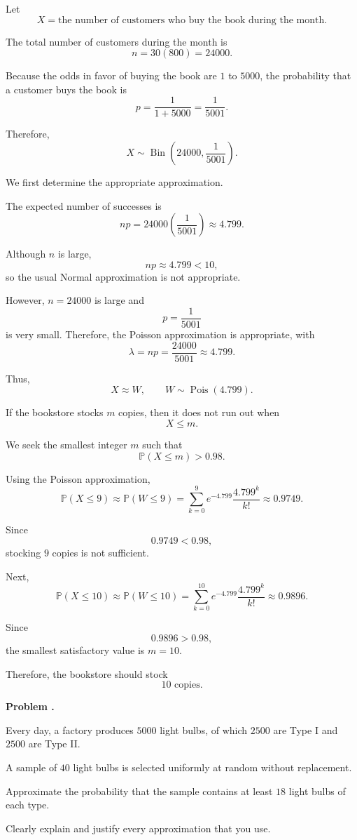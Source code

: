 \documentclass[11pt]{article}
\newcounter{problem}
\newenvironment{problem}[1][]{
    \refstepcounter{problem}
    \begin{problemheader}
        \textbf{Problem \theproblem%
        \if\relax\detokenize{#1}\relax
        \else. #1%
        \fi}
    \end{problemheader}
}{
    \vspace{0.5em}
}
\newenvironment{solution}{
    \par
    \begin{tcolorbox}[
        colback=white,
        colframe=uwgold,
        boxrule=0.7pt,
        arc=2mm,
        left=3mm,
        right=3mm,
        top=2mm,
        bottom=2mm,
        breakable,
        before skip=0.5em,
        after skip=1em,
        title=\textbf{Solution},
        coltitle=uwpurple,
        fonttitle=\bfseries
    ]
}{
    \end{tcolorbox}
}
\begin{document}
\begin{solution}

Let
\[
X=\text{the number of customers who buy the book during the month}.
\]

The total number of customers during the month is
\[
n=30(800)=24000.
\]

Because the odds in favor of buying the book are \(1\) to \(5000\), the
probability that a customer buys the book is
\[
p=\frac{1}{1+5000}=\frac{1}{5001}.
\]

Therefore,
\[
X\sim\operatorname{Bin}\left(24000,\frac{1}{5001}\right).
\]

We first determine the appropriate approximation.

The expected number of successes is
\[
np
=
24000\left(\frac{1}{5001}\right)
\approx4.799.
\]

Although \(n\) is large,
\[
np\approx4.799<10,
\]
so the usual Normal approximation is not appropriate.

However, \(n=24000\) is large and
\[
p=\frac{1}{5001}
\]
is very small. Therefore, the Poisson approximation is appropriate, with
\[
\lambda=np=\frac{24000}{5001}\approx4.799.
\]

Thus,
\[
X\approx W,
\qquad
W\sim\operatorname{Pois}(4.799).
\]

If the bookstore stocks \(m\) copies, then it does not run out when
\[
X\leq m.
\]

We seek the smallest integer \(m\) such that
\[
\mathbb{P}(X\leq m)>0.98.
\]

Using the Poisson approximation,
\[
\mathbb{P}(X\leq9)
\approx
\mathbb{P}(W\leq9)
=
\sum_{k=0}^{9}
e^{-4.799}\frac{4.799^k}{k!}
\approx0.9749.
\]

Since
\[
0.9749<0.98,
\]
stocking \(9\) copies is not sufficient.

Next,
\[
\mathbb{P}(X\leq10)
\approx
\mathbb{P}(W\leq10)
=
\sum_{k=0}^{10}
e^{-4.799}\frac{4.799^k}{k!}
\approx0.9896.
\]

Since
\[
0.9896>0.98,
\]
the smallest satisfactory value is \(m=10\).

Therefore, the bookstore should stock
\[
 {10\text{ copies}.}
\]

\end{solution}





\newpage
\begin{problem}

Every day, a factory produces \(5000\) light bulbs, of which \(2500\) are
Type I and \(2500\) are Type II.

A sample of \(40\) light bulbs is selected uniformly at random without
replacement.

Approximate the probability that the sample contains at least \(18\) light
bulbs of each type.

Clearly explain and justify every approximation that you use.

\end{problem}
\end{document}
